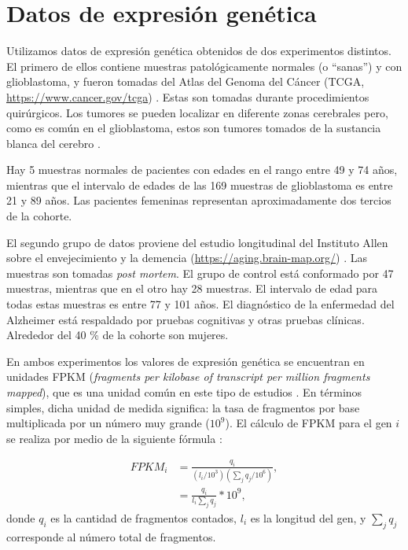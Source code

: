 \section{Datos de expresión genética}
Utilizamos datos de expresión genética obtenidos de dos experimentos distintos. El primero de ellos contiene muestras patológicamente normales (o ``sanas'') y con glioblastoma, y fueron tomadas del Atlas del Genoma del Cáncer (TCGA, \href{https://www.cancer.gov/tcga}{https://www.cancer.gov/tcga}) \cite{Brennan_2013, Tomczak2015}. Estas son tomadas durante procedimientos quirúrgicos. Los tumores se pueden localizar en diferente zonas cerebrales pero, como es común en el glioblastoma, estos son tumores tomados de la sustancia blanca del cerebro \cite{ellingson2013probabilistic}.

Hay 5 muestras normales de pacientes con edades en el rango entre 49 y 74 años, mientras que el intervalo de edades de las 169 muestras de glioblastoma es entre 21 y 89 años. Las pacientes femeninas representan aproximadamente dos tercios de la cohorte.

El segundo grupo de datos proviene del estudio longitudinal del Instituto Allen sobre el envejecimiento y la demencia (\href{https://aging.brain-map.org/}{https://aging.brain-map.org/}) \cite{Miller_2017}. Las muestras son tomadas \textit{post mortem}. El grupo de control está conformado por 47 muestras, mientras que en el otro hay 28 muestras. El intervalo de edad para todas estas muestras es entre 77 y 101 años. El diagnóstico de la enfermedad del Alzheimer está respaldado por pruebas cognitivas y otras pruebas clínicas. Alrededor del 40 \% de la cohorte son mujeres.

En ambos experimentos los valores de expresión genética se encuentran en unidades FPKM (\textit{fragments per kilobase of transcript per million fragments mapped}), que es una unidad común en este tipo de estudios \cite{Trapnell2010Cufflinks}. En términos simples, dicha unidad de medida significa: la tasa de fragmentos por base multiplicada por un número muy grande ($ 10^9 $). El cálculo de FPKM para el gen $ i $ se realiza por medio de la siguiente fórmula \cite{Zhao_2021}:

\begin{equation}
	\begin{split}
		FPKM_i &= \frac{q_i}{(l_i/10^3) (\sum_{j}q_j/10^6)} ,\\
		&= \frac{q_i}{l_i \sum_j q_j} * 10^9,
	\end{split}
\end{equation}
donde $ q_i $ es la cantidad de fragmentos contados, $ l_i $ es la longitud del gen, y $ \sum_j q_j $ corresponde al número total de fragmentos.

